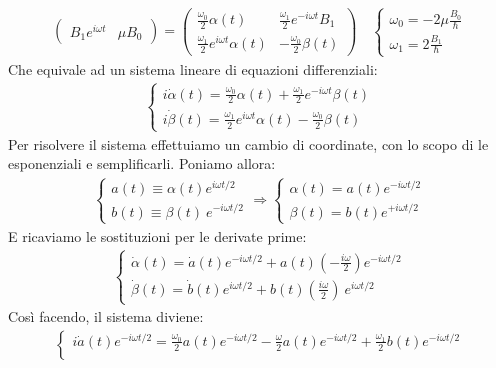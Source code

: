 \documentclass[../../InformazioneQuantistica.tex]{subfiles}
\begin{document}
\begin{enumerate}
\begin{align*}
\begin{pmatrix}
B_1 e^{i\omega t} & \mu B_0
\end{pmatrix} =\begin{pmatrix}
\frac{\omega_0}{2} \alpha(t) & \frac{\omega_1}{2}e^{-i\omega t}B_1\\
\frac{\omega_1}{2}e^{i\omega t} \alpha(t) & -\frac{\omega_0}{2}\beta(t)
\end{pmatrix} \quad \begin{cases}
\omega_0 = -2\mu \frac{B_0}{\hbar}\\
\omega_1 = 2\frac{B_1}{\hbar}
\end{cases}
\end{align*}
Che equivale ad un sistema lineare di equazioni differenziali:
\begin{align*}
\begin{cases}
i\dot{\alpha}(t) = \frac{\omega_0}{2}\alpha(t) + \frac{\omega_1}{2}e^{-i\omega t}\beta(t)\\
i\dot{\beta}(t) = \frac{\omega_1}{2} e^{i\omega t} \alpha(t) - \frac{\omega_0}{2} \beta(t)
\end{cases}
\end{align*}
Per risolvere il sistema effettuiamo un cambio di coordinate, con lo scopo di  le esponenziali e semplificarli. Poniamo allora:
\begin{align*}
\begin{cases}
a(t) \equiv \alpha(t) e^{i\omega t/2}\\
b(t) \equiv \beta(t)\ e^{-i\omega t/2}
\end{cases}\Rightarrow \begin{cases}
\alpha(t) = a(t) e^{-i\omega t/2}\\
\beta(t) = b(t) e^{+i\omega t/2}
\end{cases}
\end{align*}
E ricaviamo le sostituzioni per le derivate prime:
\begin{align*}
\begin{cases}
\dot{\alpha}(t) =\dot{a}(t) e^{-i\omega t/2} + a(t) \left(-\frac{i\omega}{2}\right) e^{-i\omega t/2}\\
\dot{\beta}(t) = \dot{b}(t) e^{i\omega t/2} + b(t) \left(\frac{i\omega}{2}\right)\ e^{i\omega t/2} 
\end{cases}
\end{align*}
Così facendo, il sistema diviene:
\begin{align*}
\begin{cases}
i \dot{a}(t) e^{-i\omega t/2} = \frac{\omega_0}{2}a(t) e^{-i\omega t/2} - \frac{\omega}{2} a(t) e^{-i\omega t/2} + \frac{\omega_1}{2}b(t)e^{-i\omega t/2}\\

\end{cases}
\end{align*}
\end{enumerate}
\end{document}
